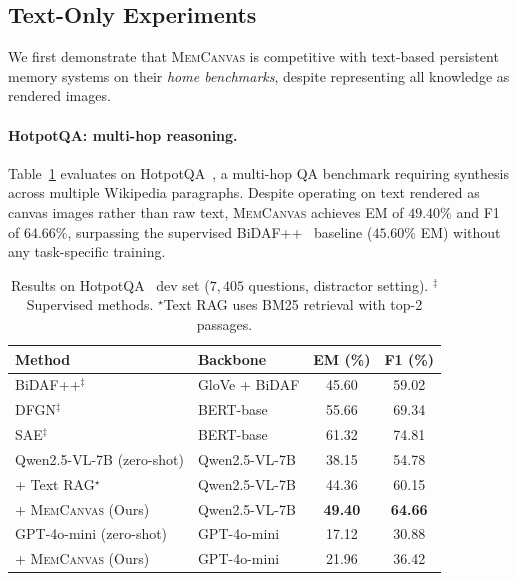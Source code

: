 \documentclass{article}
\newcommand{\memcanvas}{\textsc{MemCanvas}}
\begin{document}
\subsection{Text-Only Experiments}
\label{sec:text_exp}

We first demonstrate that \memcanvas{} is competitive with text-based persistent memory systems on their \emph{home benchmarks}, despite representing all knowledge as rendered images.

\paragraph{HotpotQA: multi-hop reasoning.}
Table~\ref{tab:hotpotqa} evaluates on HotpotQA~\citep{yang2018hotpotqa}, a multi-hop QA benchmark requiring synthesis across multiple Wikipedia paragraphs. Despite operating on text rendered as canvas images rather than raw text, \memcanvas{} achieves EM of $49.40\%$ and F1 of $64.66\%$, surpassing the supervised BiDAF++~\citep{yang2018hotpotqa} baseline ($45.60\%$ EM) without any task-specific training.

\begin{table}[t]
  \centering
  \caption{Results on HotpotQA~\citep{yang2018hotpotqa} dev set ($7{,}405$ questions, distractor setting). $^\ddagger$Supervised methods. $^\star$Text RAG uses BM25 retrieval with top-2 passages.}
  \label{tab:hotpotqa}
  \begin{tabular}{@{}llcc@{}}
    \toprule
    \textbf{Method} & \textbf{Backbone} & \textbf{EM (\%)} & \textbf{F1 (\%)} \\
    \midrule
    BiDAF++$^\ddagger$~\citep{yang2018hotpotqa} & GloVe + BiDAF & 45.60 & 59.02 \\
    DFGN$^\ddagger$~\citep{xiao2019dfgn} & BERT-base & 55.66 & 69.34 \\
    SAE$^\ddagger$~\citep{tu2020sae} & BERT-base & 61.32 & 74.81 \\
    \midrule
    Qwen2.5-VL-7B (zero-shot)  & Qwen2.5-VL-7B & 38.15 & 54.78 \\
    \;\;+ Text RAG$^\star$     & Qwen2.5-VL-7B & 44.36 & 60.15 \\
    \;\;+ \memcanvas{} (Ours)  & Qwen2.5-VL-7B & \textbf{49.40} & \textbf{64.66} \\
    \midrule
    GPT-4o-mini (zero-shot)    & GPT-4o-mini   & 17.12 & 30.88 \\
    \;\;+ \memcanvas{} (Ours)  & GPT-4o-mini   & 21.96 & 36.42 \\
    \bottomrule
  \end{tabular}
\end{table}
\end{document}
